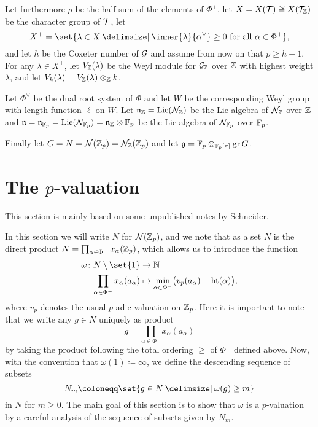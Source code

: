 Let furthermore $\rho$ be the half-sum of the elements of $\Phi^+$, let $X = X(\mathcal{T}) \cong X(\mathcal{T}_{\mathbb{Z}})$ be the character group of $\mathcal{T}$, let
\begin{equation*}
  X^+ = \set{\lambda \in X \given \inner{\lambda}{\alpha^\vee} \geq 0 \text{ for all } \alpha \in \Phi^+},
\end{equation*}
and let $h$ be the Coxeter number of $\mathcal{G}$ and assume from now on that $p \geq h-1$.
For any $\lambda \in X^+$, let $V_{\mathbb{Z}}(\lambda)$ be the Weyl module for $\mathcal{G}_{\mathbb{Z}}$ over $\mathbb{Z}$ with highest weight $\lambda$, and let $V_k(\lambda) = V_{\mathbb{Z}}(\lambda) \otimes_{\mathbb{Z}} k$.

Let $\Phi^\vee$ be the dual root system of $\Phi$ and let $W$ be the corresponding Weyl group with length function $\ell$ on $W$. Let $\mathfrak{n}_{\mathbb{Z}} = \operatorname{Lie}(\mathcal{N}_{\mathbb{Z}})$ be the Lie algebra of $\mathcal{N}_{\mathbb{Z}}$ over $\mathbb{Z}$ and $\mathfrak{n} = \mathfrak{n}_{\mathbb{F}_p} = \operatorname{Lie}(\mathcal{N}_{\mathbb{F}_p}) = \mathfrak{n}_{\mathbb{Z}} \otimes \mathbb{F}_p$ be the Lie algebra of $\mathcal{N}_{\mathbb{F}_p}$ over $\mathbb{F}_p$.

Finally let $G = N = \mathcal{N}(\mathbb{Z}_p) = \mathcal{N}_{\mathbb{Z}}(\mathbb{Z}_p)$ and let $\mathfrak{g} = \mathbb{F}_p \otimes_{\mathbb{F}_p[\pi]} \operatorname{gr} G$.

\section{The \texorpdfstring{$p$}{p}-valuation}\label{sec:pval}

This section is mainly based on some unpublished notes by Schneider.

In this section we will write $N$ for $\mathcal{N}(\mathbb{Z}_p)$, and we note that as a set $N$ is the direct product $N = \prod_{\alpha \in \Phi^{-}} x_\alpha(\mathbb{Z}_p)$, which allows us to introduce the function
\begin{align*}
  \omega \colon N \setminus \set{1} &\to \N \\
  \prod_{\alpha \in \Phi^{-}} x_\alpha(a_\alpha) &\mapsto \min_{\alpha \in \Phi^{-}} \bigl( v_p(a_\alpha) - \Ht(\alpha) \bigr),
\end{align*}
where $v_p$ denotes the usual $p$-adic valuation on $\mathbb{Z}_p$. Here it is important to note that we write any $g \in N$ uniquely as product
\begin{equation*}
  g = \prod_{\alpha \in \Phi^{-}} x_\alpha(a_\alpha)
\end{equation*}
by taking the product following the total ordering $\geq$ of $\Phi^{-}$ defined above. Now, with the convention that $\omega(1) \coloneqq \infty$, we define the descending sequence of subsets
\begin{equation*}
  N_m \coloneqq \set{g \in N \given \omega(g) \geq m}
\end{equation*}
in $N$ for $m\geq0$. The main goal of this section is to show that $\omega$ is a $p$-valuation by a careful analysis of the sequence of subsets given by $N_m$.

